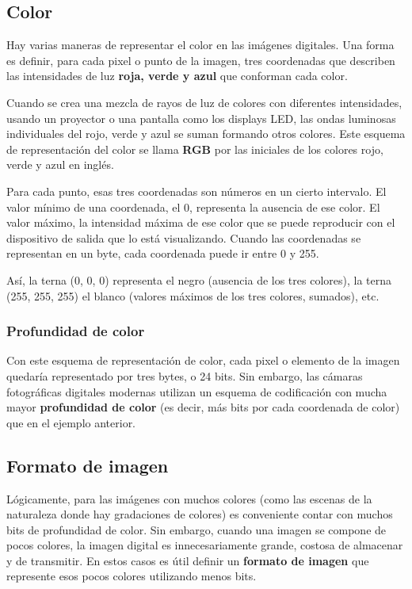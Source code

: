 \documentclass[spanish,a4paper,]{article}
\begin{document}
\hypertarget{color}{%
\subsection{Color}\label{color}}

Hay varias maneras de representar el color en las imágenes digitales.
Una forma es definir, para cada pixel o punto de la imagen, tres
coordenadas que describen las intensidades de luz \textbf{roja, verde y
azul} que conforman cada color.

Cuando se crea una mezcla de rayos de luz de colores con diferentes
intensidades, usando un proyector o una pantalla como los displays LED,
las ondas luminosas individuales del rojo, verde y azul se suman
formando otros colores. Este esquema de representación del color se
llama \textbf{RGB} por las iniciales de los colores rojo, verde y azul
en inglés.

Para cada punto, esas tres coordenadas son números en un cierto
intervalo. El valor mínimo de una coordenada, el 0, representa la
ausencia de ese color. El valor máximo, la intensidad máxima de ese
color que se puede reproducir con el dispositivo de salida que lo está
visualizando. Cuando las coordenadas se representan en un byte, cada
coordenada puede ir entre 0 y 255.

Así, la terna (0, 0, 0) representa el negro (ausencia de los tres
colores), la terna (255, 255, 255) el blanco (valores máximos de los
tres colores, sumados), etc.

\hypertarget{profundidad-de-color}{%
\subsubsection{Profundidad de color}\label{profundidad-de-color}}

Con este esquema de representación de color, cada pixel o elemento de la
imagen quedaría representado por tres bytes, o 24 bits. Sin embargo, las
cámaras fotográficas digitales modernas utilizan un esquema de
codificación con mucha mayor \textbf{profundidad de color} (es decir,
más bits por cada coordenada de color) que en el ejemplo anterior.

\hypertarget{formato-de-imagen}{%
\subsection{Formato de imagen}\label{formato-de-imagen}}

Lógicamente, para las imágenes con muchos colores (como las escenas de
la naturaleza donde hay gradaciones de colores) es conveniente contar
con muchos bits de profundidad de color. Sin embargo, cuando una imagen
se compone de pocos colores, la imagen digital es innecesariamente
grande, costosa de almacenar y de transmitir. En estos casos es útil
definir un \textbf{formato de imagen} que represente esos pocos colores
utilizando menos bits.
\end{document}
